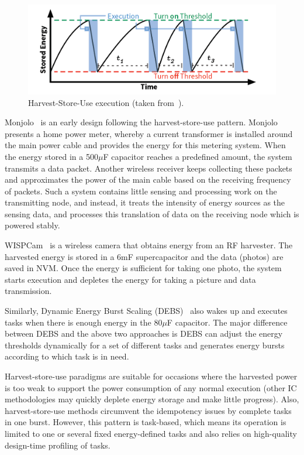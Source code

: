 \begin{figure}[!htb]
    \centering
    \includegraphics[width=14cm]{ch2_review/figures/saveanduse}
    \caption{Harvest-Store-Use execution (taken from~\cite{hester2017new}).}
    \label{Figure:saveanduse}
\end{figure}

Monjolo~\cite{debruin2013monjolo} is an early design following the harvest-store-use pattern. Monjolo presents a home power meter, whereby a current transformer is installed around the main power cable and provides the energy for this metering system. When the energy stored in a 500$\mu$F capacitor reaches a predefined amount, the system transmits a data packet. Another wireless receiver keeps collecting these packets and approximates the power of the main cable based on the receiving frequency of packets. Such a system contains little sensing and processing work on the transmitting node, and instead, it treats the intensity of energy sources as the sensing data, and processes this translation of data on the receiving node which is powered stably.

WISPCam~\cite{naderiparizi2015wispcam} is a wireless camera that obtains energy from an RF harvester. The harvested energy is stored in a 6mF supercapacitor and the data (photos) are saved in NVM. Once the energy is sufficient for taking one photo, the system starts execution and depletes the energy for taking a picture and data transmission. 

Similarly, Dynamic Energy Burst Scaling (DEBS)~\cite{gomez2016dynamic} also wakes up and executes tasks when there is enough energy in the 80$\mu$F capacitor. The major difference between DEBS and the above two approaches is DEBS can adjust the energy thresholds dynamically for a set of different tasks and generates energy bursts according to which task is in need.

Harvest-store-use paradigms are suitable for occasions where the harvested power is too weak to support the power consumption of any normal execution (other IC methodologies may quickly deplete energy storage and make little progress). Also, harvest-store-use methods circumvent the idempotency issues by complete tasks in one burst. However, this pattern is task-based, which means its operation is limited to one or several fixed energy-defined tasks and also relies on high-quality design-time profiling of tasks.

